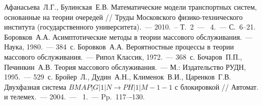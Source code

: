 \documentclass{report}
\newcommand{\No}{\textnumero}
\begin{document}
\newpage
\begin{thebibliography}{99}
 Афанасьева~Л.Г., Булинская~Е.В. Математические модели транспортных систем, основанные на теории очередей // Труды Московского физико-технического института (государственного университета).~--- 2010.~-- Т.~2~--- \No{}~4.~--- С.~6--21.
 Боровков~А.А. Асимптотические методы в теории массового обслуживания.~--- Наука, 1980.~--- 384~с.
 Боровков~А.А. Вероятностные процессы в теории массового обслуживания.~--- Рипол Классик, 1972.~--- 368~с.
 Бочаров~П.П., Печинкин~А.В. Теория массового обслуживания.~--- М.: Издательство РУДН, 1995.~--- 529~с.
 Бройер~Л., Дудин~А.Н., Клименок~В.И., Царенков~Г.В. Двухфазная система $BMAP|G|1|N \to PH|1|M-1-1$ с блокировкой // Автомат. и телемех.~--- 2004.~--- \No{}~1.~--- Pp.~117–-130.


\end{thebibliography}
\end{document}
